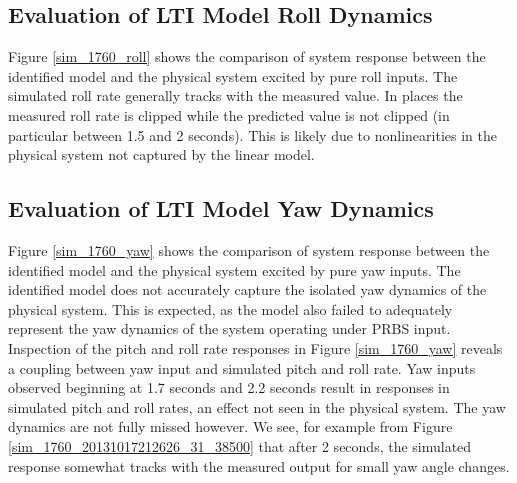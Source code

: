 \subsection{Evaluation of LTI Model Roll Dynamics}
Figure \ref{sim_1760_roll} shows the comparison of system response between the identified model and the physical system excited by pure roll inputs. The simulated roll rate generally tracks with the measured value. In places the measured roll rate is clipped while the predicted value is not clipped (in particular between 1.5 and 2 seconds). This is likely due to nonlinearities in the physical system not captured by the linear model.


\subsection{Evaluation of LTI Model Yaw Dynamics}
Figure \ref{sim_1760_yaw} shows the comparison of system response between the identified model and the physical system excited by pure yaw inputs. The identified model does not accurately capture the isolated yaw dynamics of the physical system. This is expected, as the model also failed to adequately represent the yaw dynamics of the system operating under PRBS input. Inspection of the pitch and roll rate responses in Figure \ref{sim_1760_yaw} reveals a coupling between yaw input and simulated pitch and roll rate. Yaw inputs observed beginning at 1.7 seconds and 2.2 seconds result in responses in simulated pitch and roll rates, an effect not seen in the physical system. The yaw dynamics are not fully missed however. We see, for example from Figure \ref{sim_1760_20131017212626_31_38500} that after 2 seconds, the simulated response somewhat tracks with the measured output for small yaw angle changes.







